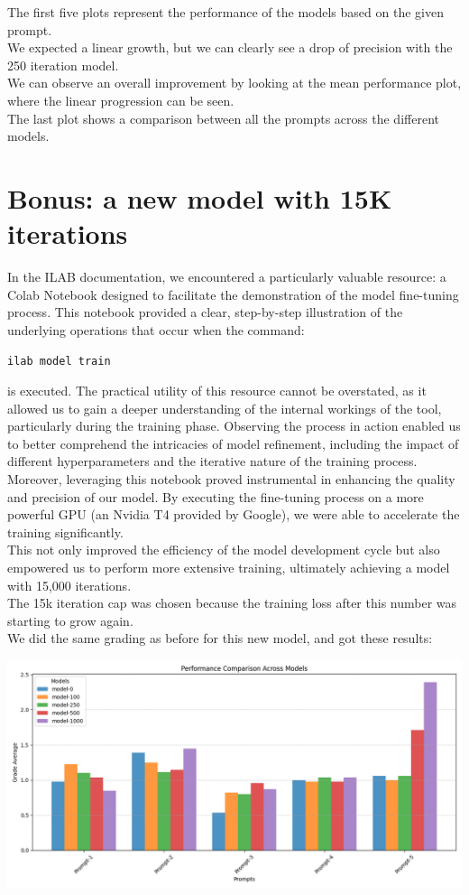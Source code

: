 \documentclass[12pt]{article}
\begin{document}
The first five plots represent the performance of the models based on the given prompt.\\
We expected a linear growth, but we can clearly see a drop of precision with the 250 iteration model.\\
We can observe an overall improvement by looking at the mean performance plot, where the linear progression can be seen.\\
The last plot shows a comparison between all the prompts across the different models.

\section{Bonus: a new model with 15K iterations}
In the ILAB documentation, we encountered a particularly valuable resource: a Colab Notebook designed to facilitate the demonstration of the model fine-tuning process. This notebook provided a clear, step-by-step illustration of the underlying operations that occur when the command:
\begin{center}
    \texttt{ilab model train}
\end{center}
is executed. The practical utility of this resource cannot be overstated, as it allowed us to gain a deeper understanding of the internal workings of the tool, particularly during the training phase. Observing the process in action enabled us to better comprehend the intricacies of model refinement, including the impact of different hyperparameters and the iterative nature of the training process.\vspace{14pt}\\
Moreover, leveraging this notebook proved instrumental in enhancing the quality and precision of our model. By executing the fine-tuning process on a more powerful GPU (an Nvidia T4 provided by Google), we were able to accelerate the training significantly.\\
This not only improved the efficiency of the model development cycle but also empowered us to perform more extensive training, ultimately achieving a model with 15,000 iterations.\vspace{14pt}\\
The 15k iteration cap was chosen because the training loss after this number was starting to grow again.\\
We did the same grading as before for this new model, and got these results:
\begin{center}
    \includegraphics[width=1\textwidth]{img/plots/performance-comparison.png}
\end{center}
\end{document}
